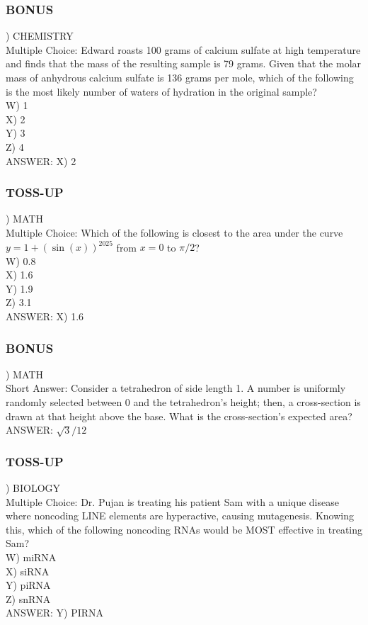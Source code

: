 \documentclass{article}
\begin{document}
\subsubsection*{BONUS}
) CHEMISTRY \\
Multiple Choice: Edward roasts 100 grams of calcium sulfate at high temperature and finds that the mass of the resulting sample is 79 grams. Given that the molar mass of anhydrous calcium sulfate is 136 grams per mole, which of the following is the most likely number of waters of hydration in the original sample? \\
W) 1 \\
X) 2 \\
Y) 3 \\
Z) 4 \\
ANSWER: X) 2

\newpage

\subsubsection*{TOSS-UP}
) MATH \\
Multiple Choice: Which of the following is closest to the area under the curve $y=1+(\sin(x))^{2025}$ from $x=0$ to $\pi/2$? \\
W) 0.8 \\
X) 1.6 \\
Y) 1.9 \\
Z) 3.1 \\
ANSWER: X) 1.6

\subsubsection*{BONUS}
) MATH \\
Short Answer: Consider a tetrahedron of side length 1. A number is uniformly randomly selected between 0 and the tetrahedron's height; then, a cross-section is drawn at that height above the base. What is the cross-section's expected area? \\
ANSWER: $\sqrt{3}/12$

\subsubsection*{TOSS-UP}
) BIOLOGY \\
Multiple Choice: Dr. Pujan is treating his patient Sam with a unique disease where noncoding LINE elements are hyperactive, causing mutagenesis. Knowing this, which of the following noncoding RNAs would be MOST effective in treating Sam? \\
W) miRNA \\
X) siRNA \\
Y) piRNA \\
Z) snRNA \\
ANSWER: Y) PIRNA
\end{document}
